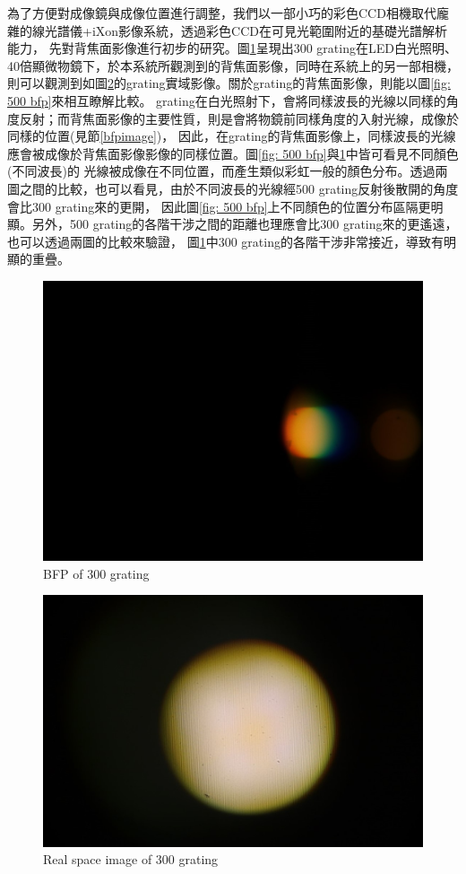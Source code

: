 \documentclass[12pt]{article}
\begin{document}
為了方便對成像鏡與成像位置進行調整，我們以一部小巧的彩色CCD相機取代龐雜的線光譜儀+iXon影像系統，透過彩色CCD在可見光範圍附近的基礎光譜解析能力，
先對背焦面影像進行初步的研究。圖\ref{fig: 300 bfp}呈現出300 grating在LED白光照明、40倍顯微物鏡下，於本系統所觀測到的背焦面影像，同時在系統上的另一部相機，
則可以觀測到如圖\ref{fig: 300 real}的grating實域影像。關於grating的背焦面影像，則能以圖\ref{fig: 500 bfp}來相互瞭解比較。
grating在白光照射下，會將同樣波長的光線以同樣的角度反射；而背焦面影像的主要性質，則是會將物鏡前同樣角度的入射光線，成像於同樣的位置(見節\ref{bfpimage})，
因此，在grating的背焦面影像上，同樣波長的光線應會被成像於背焦面影像影像的同樣位置。圖\ref{fig: 500 bfp}與\ref{fig: 300 bfp}中皆可看見不同顏色(不同波長)的
光線被成像在不同位置，而產生類似彩虹一般的顏色分布。透過兩圖之間的比較，也可以看見，由於不同波長的光線經500 grating反射後散開的角度會比300 grating來的更開，
因此圖\ref{fig: 500 bfp}上不同顏色的位置分布區隔更明顯。另外，500 grating的各階干涉之間的距離也理應會比300 grating來的更遙遠，也可以透過兩圖的比較來驗證，
圖\ref{fig: 300 bfp}中300 grating的各階干涉非常接近，導致有明顯的重疊。

\begin{figure}[h]
    \centering
    \includegraphics[width = 0.8\linewidth]{300bfp.jpeg}
    \caption{BFP of 300 grating}
    \label{fig: 300 bfp}
\end{figure}

\begin{figure}[h]
    \centering
    \includegraphics[width = 0.8\linewidth]{300real.jpeg}
    \caption{Real space image of 300 grating}
    \label{fig: 300 real}
\end{figure}
\end{document}

